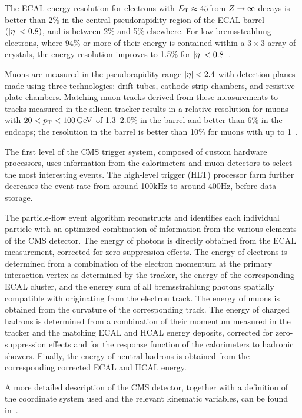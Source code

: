 The ECAL energy resolution for electrons with $E_{\mathrm{T}} \approx 45$\GeV from $\relax{Z} \rightarrow \mathrm{e} \mathrm{e}$ decays is better than 2\% in the central pseudorapidity region of the ECAL barrel $(\lvert \eta \rvert < 0.8)$, and is between 2\% and 5\% elsewhere. For low-bremsstrahlung electrons, where 94\% or more of their energy is contained within a $3 \times 3$ array of crystals, the energy resolution improves to 1.5\% for $\lvert \eta \rvert < 0.8$~\cite{Chatrchyan:2013dga}.

Muons are measured in the pseudorapidity range $\lvert \eta \rvert< 2.4$ with detection planes made using three technologies: drift tubes, cathode strip chambers, and resistive-plate chambers. Matching muon tracks derived from these measurements to tracks measured in the silicon tracker results in a relative \PT resolution for muons with $20 <p_{\mathrm{T}} < 100\,\text{Ge\hspace{-.08em}V}$ of 1.3--2.0\% in the barrel and better than 6\% in the endcaps; the \pt resolution in the barrel is better than 10\% for muons with \pt up to 1\TeV~\cite{Chatrchyan:2012xi}.

The first level of the CMS trigger system, composed of custom hardware processors, uses information from the calorimeters and muon detectors to select the most interesting events. The high-level trigger (HLT) processor farm further decreases the event rate from around 100\unit{kHz} to around 400\unit{Hz}, before data storage.

The particle-flow event algorithm reconstructs and identifies each individual particle with an optimized combination of information from the various elements of the CMS detector. The energy of photons is directly obtained from the ECAL measurement, corrected for zero-suppression effects. The energy of electrons is determined from a combination of the electron momentum at the primary interaction vertex as determined by the tracker, the energy of the corresponding ECAL cluster, and the energy sum of all bremsstrahlung photons spatially compatible with originating from the electron track. The energy of muons is obtained from the curvature of the corresponding track. The energy of charged hadrons is determined from a combination of their momentum measured in the tracker and the matching ECAL and HCAL energy deposits, corrected for zero-suppression effects and for the response function of the calorimeters to hadronic showers. Finally, the energy of neutral hadrons is obtained from the corresponding corrected ECAL and HCAL energy.

A more detailed description of the CMS detector, together with a definition of the coordinate system used and the relevant kinematic variables, can be found in~\cite{Chatrchyan:2008zzk}.

